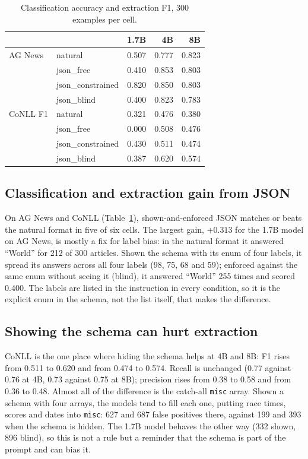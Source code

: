\documentclass[10pt,twocolumn]{article}
\begin{document}
\begin{table}[t]
\centering\small
\begin{tabular}{llrrr}
\toprule
& & 1.7B & 4B & 8B \\
\midrule
AG News & natural & 0.507 & 0.777 & 0.823 \\
& json\_free & 0.410 & 0.853 & 0.803 \\
& json\_constrained & 0.820 & 0.850 & 0.803 \\
& json\_blind & 0.400 & 0.823 & 0.783 \\
\midrule
CoNLL F1 & natural & 0.321 & 0.476 & 0.380 \\
& json\_free & 0.000 & 0.508 & 0.476 \\
& json\_constrained & 0.430 & 0.511 & 0.474 \\
& json\_blind & 0.387 & 0.620 & 0.574 \\
\bottomrule
\end{tabular}
\caption{Classification accuracy and extraction F1, 300 examples per cell.}
\label{tab:cls}
\end{table}

\subsection{Classification and extraction gain from JSON}

On AG News and CoNLL (Table~\ref{tab:cls}), shown-and-enforced JSON matches or beats the natural format in five of
six cells. The largest gain, $+0.313$ for the 1.7B model on AG News, is mostly a fix for label bias: in the natural
format it answered ``World'' for 212 of 300 articles. Shown the schema with its enum of four labels, it spread its
answers across all four labels (98, 75, 68 and 59); enforced against the same enum without seeing it (blind), it
answered ``World'' 255 times and scored 0.400. The labels are
listed in the instruction in every condition, so it is the explicit enum in the schema, not the list itself, that
makes the difference.

\subsection{Showing the schema can hurt extraction}

CoNLL is the one place where hiding the schema helps at 4B and 8B: F1 rises from 0.511 to 0.620 and from 0.474 to
0.574. Recall is unchanged (0.77 against 0.76 at 4B, 0.73 against 0.75 at 8B); precision rises from 0.38 to 0.58 and
from 0.36 to 0.48. Almost all of the difference is the catch-all \texttt{misc} array. Shown a schema with four arrays,
the models tend to fill each one, putting race times, scores and dates into \texttt{misc}: 627 and 687 false
positives there, against 199 and 393 when the schema is hidden. The 1.7B model behaves the other way (332 shown, 896
blind), so this is not a rule but a reminder that the schema is part of the prompt and can bias it.
\end{document}
